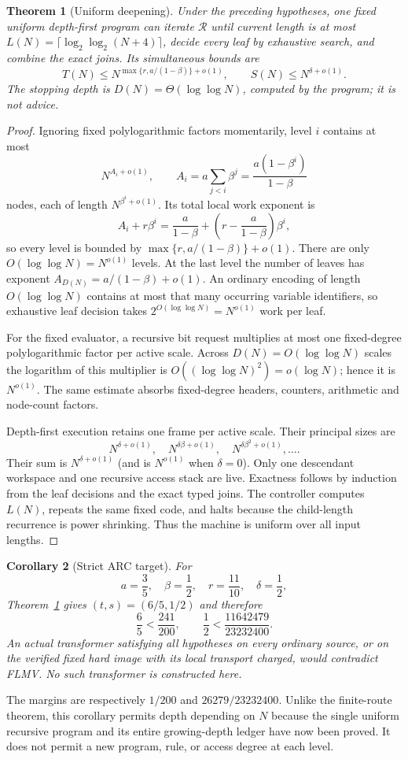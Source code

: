 \documentclass[11pt]{article}
\newtheorem{theorem}{Theorem}
\newtheorem{corollary}[theorem]{Corollary}
\begin{document}
\begin{theorem}[Uniform deepening]\label{thm:deep}
Under the preceding hypotheses, one fixed uniform depth-first program can
iterate $\mathcal R$ until current length is at most
$L(N)=\lceil\log_2\log_2(N+4)\rceil$, decide every leaf by exhaustive search,
and combine the exact joins.  Its simultaneous bounds are
\[
 T(N)\le N^{\max\{r,a/(1-\beta)\}+o(1)},\qquad
 S(N)\le N^{\delta+o(1)}.
\]
The stopping depth is $D(N)=\Theta(\log\log N)$, computed by the program;
it is not advice.
\end{theorem}
\begin{proof}
Ignoring fixed polylogarithmic factors momentarily, level $i$ contains at
most
\[
 N^{A_i+o(1)},\qquad
 A_i=a\sum_{j<i}\beta^j
 =\frac{a(1-\beta^i)}{1-\beta}
\]
nodes, each of length $N^{\beta^i+o(1)}$.  Its total local work exponent is
\[
 A_i+r\beta^i
 =\frac{a}{1-\beta}
 +\left(r-\frac{a}{1-\beta}\right)\beta^i,
\]
so every level is bounded by
$\max\{r,a/(1-\beta)\}+o(1)$.  There are only
$O(\log\log N)=N^{o(1)}$ levels.  At the last level the number of leaves has
exponent $A_{D(N)}=a/(1-\beta)+o(1)$.  An ordinary encoding of length
$O(\log\log N)$ contains at most that many occurring variable identifiers,
so exhaustive leaf decision takes $2^{O(\log\log N)}=N^{o(1)}$ work per leaf.

For the fixed evaluator, a recursive bit request multiplies at most one
fixed-degree polylogarithmic factor per active scale.  Across
$D(N)=O(\log\log N)$ scales the logarithm of this multiplier is
$O((\log\log N)^2)=o(\log N)$; hence it is $N^{o(1)}$.  The same estimate
absorbs fixed-degree headers, counters, arithmetic and node-count factors.

Depth-first execution retains one frame per active scale.  Their principal
sizes are
\[
 N^{\delta+o(1)},\quad
 N^{\delta\beta+o(1)},\quad
 N^{\delta\beta^2+o(1)},\ldots .
\]
Their sum is $N^{\delta+o(1)}$ (and is $N^{o(1)}$ when $\delta=0$).
Only one descendant workspace and one recursive access stack are live.
Exactness follows by induction from the leaf decisions and the exact typed
joins.  The controller computes $L(N)$, repeats the same fixed code, and
halts because the child-length recurrence is power shrinking.  Thus the
machine is uniform over all input lengths.
\end{proof}

\begin{corollary}[Strict ARC target]\label{cor:box}
For
\[
 a=\frac35,\quad\beta=\frac12,\quad
 r=\frac{11}{10},\quad\delta=\frac12,
\]
Theorem~\ref{thm:deep} gives $(t,s)=(6/5,1/2)$ and therefore
\[
 \frac65<\frac{241}{200},\qquad
 \frac12<\frac{11642479}{23232400}.
\]
An actual transformer satisfying all hypotheses on every ordinary source, or
on the verified fixed hard image with its local transport charged, would
contradict FLMV.  No such transformer is constructed here.
\end{corollary}
The margins are respectively $1/200$ and
$26279/23232400$.  Unlike the finite-route theorem, this corollary permits
depth depending on $N$ because the single uniform recursive program and its
entire growing-depth ledger have now been proved.  It does not permit a new
program, rule, or access degree at each level.
\end{document}
